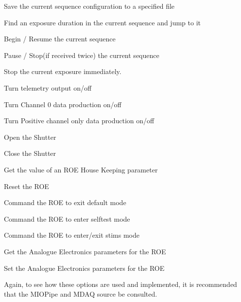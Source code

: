 \begin{list}{}{}
\item Save the current sequence configuration to a specified file
\item Find an exposure duration in the current sequence and jump to it
\item Begin / Resume the current sequence
\item Pause / Stop(if received twice) the current sequence
\item Stop the current exposure immediately.
\item Turn telemetry output on/off
\item Turn Channel 0 data production on/off
\item Turn Positive channel only data production on/off
\item Open the Shutter
\item Close the Shutter
\item Get the value of an ROE House Keeping parameter
\item Reset the ROE
\item Command the ROE to exit default mode
\item Command the ROE to enter selftest mode
\item Command the ROE to enter/exit stims mode
\item Get the Analogue Electronics parameters for the ROE
\item Set the Analogue Electronics parameters for the ROE
\end{list}
Again, to see how these options are used and implemented, it is recommended that
the MIOPipe and MDAQ source be consulted.

